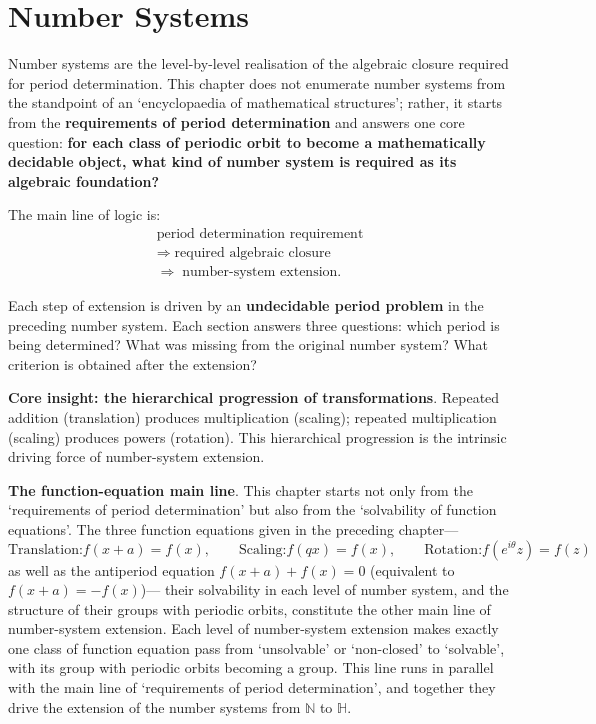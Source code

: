 \chapter{Number Systems}

\begin{remark}\label{rem:chapter_positioning_ch2}
Number systems are the level-by-level realisation of the algebraic closure required for period determination. This chapter does not enumerate number systems from the standpoint of an `encyclopaedia of mathematical structures'; rather, it starts from the \textbf{requirements of period determination} and answers one core question: \textbf{for each class of periodic orbit to become a mathematically decidable object, what kind of number system is required as its algebraic foundation?}

The main line of logic is:
\[
\begin{gathered}\text{period determination requirement}\\\Longrightarrow\;\text{required algebraic closure}\\\Longrightarrow\;\text{number-system extension}.\end{gathered}
\]

Each step of extension is driven by an \textbf{undecidable period problem} in the preceding number system. Each section answers three questions: which period is being determined? What was missing from the original number system? What criterion is obtained after the extension?

\textbf{Core insight: the hierarchical progression of transformations}. Repeated addition (translation) produces multiplication (scaling); repeated multiplication (scaling) produces powers (rotation). This hierarchical progression is the intrinsic driving force of number-system extension.

\textbf{The function-equation main line}. This chapter starts not only from the `requirements of period determination' but also from the `solvability of function equations'. The three function equations given in the preceding chapter---
\[
\text{Translation:} f(x+a)=f(x),\qquad
\text{Scaling:} f(qx)=f(x),\qquad
\text{Rotation:} f(e^{i\theta}z)=f(z)
\]
as well as the antiperiod equation $f(x+a)+f(x)=0$ (equivalent to $f(x+a)=-f(x)$)---
their solvability in each level of number system, and the structure of their groups with periodic orbits, constitute the other main line of number-system extension. Each level of number-system extension makes exactly one class of function equation pass from `unsolvable' or `non-closed' to `solvable', with its group with periodic orbits becoming a group. This line runs in parallel with the main line of `requirements of period determination', and together they drive the extension of the number systems from $\mathbb N$ to $\mathbb H$.


\end{remark}
